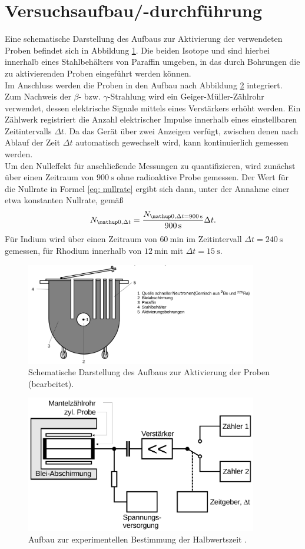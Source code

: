 \section{Versuchsaufbau/-durchführung}
Eine schematische Darstellung des Aufbaus zur Aktivierung der verwendeten Proben befindet sich in Abbildung \ref{fig: neutronenquelle}.
Die beiden Isotope  und  sind hierbei innerhalb eines Stahlbehälters von Paraffin umgeben, in das durch Bohrungen
die zu aktivierenden Proben eingeführt werden können.\\
Im Anschluss werden die Proben in den Aufbau nach Abbildung \ref{fig: aufbau} integriert.
Zum Nachweis der $\beta$- bzw. $\gamma$-Strahlung wird ein Geiger-Müller-Zählrohr verwendet, dessen elektrische Signale
mittels eines Verstärkers erhöht werden. Ein Zählwerk registriert die Anzahl elektrischer Impulse innerhalb eines einstellbaren
Zeitintervalls $\Delta t$. Da das Gerät über zwei Anzeigen verfügt, zwischen denen nach Ablauf der Zeit $\Delta t$ automatisch gewechselt
wird, kann kontinuierlich gemessen werden. \\
Um den Nulleffekt für anschließende Messungen zu quantifizieren, wird zunächst
über einen Zeitraum von $\SI{900}{\second}$ ohne radioaktive Probe gemessen. Der Wert für die Nullrate in Formel \eqref{eq: nullrate}
ergibt sich dann, unter der Annahme einer etwa konstanten Nullrate, gemäß
\begin{equation}
  N\ua{0,\Delta t} = \frac{N\ua{0, \Delta t = \SI{900}{\second}}}{ \SI{900}{\second}} \Delta t.
\end{equation}
Für Indium wird über einen Zeitraum von $\SI{60}{\minute}$ im Zeitintervall $\Delta t = \SI{240}{\second}$ gemessen,
für Rhodium innerhalb von $\SI{12}{\minute}$ mit $\Delta t = \SI{15}{\second}$.
\begin{figure}
  \centering
  \includegraphics[width=0.9\textwidth]{pics/aufbau.png}
  \caption{Schematische Darstellung des Aufbaus zur Aktivierung der Proben \cite{anleitung702}(bearbeitet).}
  \label{fig: neutronenquelle}
  \end{figure}
\begin{figure}
\centering
\includegraphics[width=0.9\textwidth]{pics/aufbau_2.png}
\caption{Aufbau zur experimentellen Bestimmung der Halbwertszeit \cite{anleitung702}.}
\label{fig: aufbau}
\end{figure}
